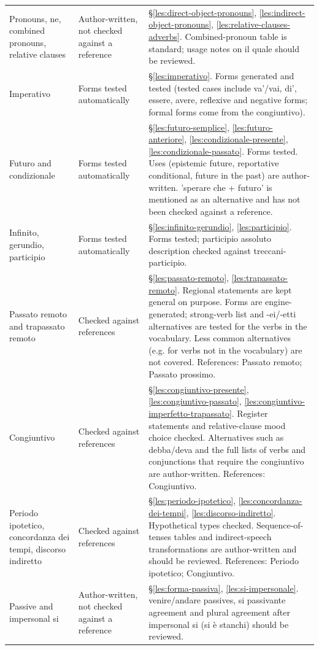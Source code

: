 \documentclass[11pt,a4paper,twoside,openright]{book}
\begin{document}
{\begin{xltabular}{\linewidth}{@{}p{3.6cm} p{2.6cm} L@{}}
Pronouns, ne, combined pronouns, relative clauses & Author-written, not checked against a reference & \S\ref{les:direct-object-pronouns}, \ref{les:indirect-object-pronouns}, \ref{les:relative-clauses-adverbs}. Combined-pronoun table is standard; usage notes on il quale should be reviewed. \\
Imperativo & Forms tested automatically & \S\ref{les:imperativo}. Forms generated and tested (tested cases include va'/vai, di', essere, avere, reflexive and negative forms; formal forms come from the congiuntivo). \\
Futuro and condizionale & Forms tested automatically & \S\ref{les:futuro-semplice}, \ref{les:futuro-anteriore}, \ref{les:condizionale-presente}, \ref{les:condizionale-passato}. Forms tested. Uses (epistemic future, reportative conditional, future in the past) are author-written. 'sperare che + futuro' is mentioned as an alternative and has not been checked against a reference. \\
Infinito, gerundio, participio & Forms tested automatically & \S\ref{les:infinito-gerundio}, \ref{les:participio}. Forms tested; participio assoluto description checked against treccani-participio. \\
Passato remoto and trapassato remoto & Checked against references & \S\ref{les:passato-remoto}, \ref{les:trapassato-remoto}. Regional statements are kept general on purpose. Forms are engine-generated; strong-verb list and -ei/-etti alternatives are tested for the verbs in the vocabulary. Less common alternatives (e.g. for verbs not in the vocabulary) are not covered. References: Passato remoto; Passato prossimo. \\
Congiuntivo & Checked against references & \S\ref{les:congiuntivo-presente}, \ref{les:congiuntivo-passato}, \ref{les:congiuntivo-imperfetto-trapassato}. Register statements and relative-clause mood choice checked. Alternatives such as debba/deva and the full lists of verbs and conjunctions that require the congiuntivo are author-written. References: Congiuntivo. \\
Periodo ipotetico, concordanza dei tempi, discorso indiretto & Checked against references & \S\ref{les:periodo-ipotetico}, \ref{les:concordanza-dei-tempi}, \ref{les:discorso-indiretto}. Hypothetical types checked. Sequence-of-tenses tables and indirect-speech transformations are author-written and should be reviewed. References: Periodo ipotetico; Congiuntivo. \\
Passive and impersonal si & Author-written, not checked against a reference & \S\ref{les:forma-passiva}, \ref{les:si-impersonale}. venire/andare passives, si passivante agreement and plural agreement after impersonal si (si è stanchi) should be reviewed. \\

\end{xltabular}}
\end{document}
